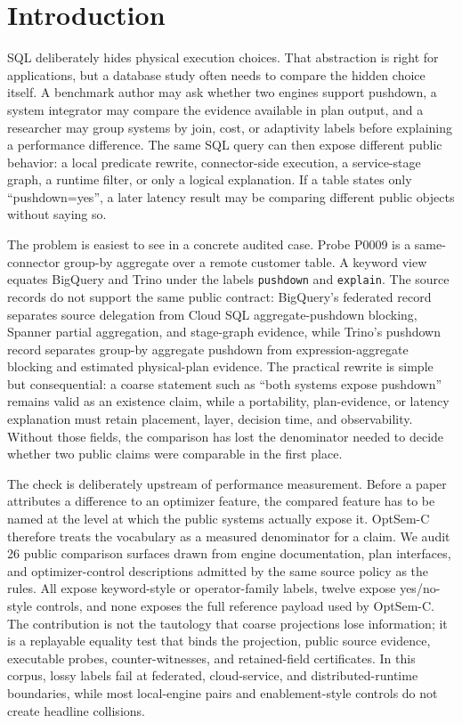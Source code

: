 \section{Introduction}
SQL deliberately hides physical execution choices.  That abstraction is right for applications, but a database study often needs to compare the hidden choice itself.  A benchmark author may ask whether two engines support pushdown, a system integrator may compare the evidence available in plan output, and a researcher may group systems by join, cost, or adaptivity labels before explaining a performance difference.  The same SQL query can then expose different public behavior: a local predicate rewrite, connector-side execution, a service-stage graph, a runtime filter, or only a logical explanation.  If a table states only ``pushdown=yes'', a later latency result may be comparing different public objects without saying so.

The problem is easiest to see in a concrete audited case.  Probe P0009 is a same-connector group-by aggregate over a remote customer table.  A keyword view equates BigQuery and Trino under the labels \texttt{pushdown} and \texttt{explain}.  The source records do not support the same public contract: BigQuery's federated record separates source delegation from Cloud SQL aggregate-pushdown blocking, Spanner partial aggregation, and stage-graph evidence, while Trino's pushdown record separates group-by aggregate pushdown from expression-aggregate blocking and estimated physical-plan evidence.  The practical rewrite is simple but consequential: a coarse statement such as ``both systems expose pushdown'' remains valid as an existence claim, while a portability, plan-evidence, or latency explanation must retain placement, layer, decision time, and observability.  Without those fields, the comparison has lost the denominator needed to decide whether two public claims were comparable in the first place.

The check is deliberately upstream of performance measurement.  Before a paper attributes a difference to an optimizer feature, the compared feature has to be named at the level at which the public systems actually expose it.  OptSem-C therefore treats the vocabulary as a measured denominator for a claim.  We audit 26 public comparison surfaces drawn from engine documentation, plan interfaces, and optimizer-control descriptions admitted by the same source policy as the rules.  All expose keyword-style or operator-family labels, twelve expose yes/no-style controls, and none exposes the full reference payload used by OptSem-C.  The contribution is not the tautology that coarse projections lose information; it is a replayable equality test that binds the projection, public source evidence, executable probes, counter-witnesses, and retained-field certificates.  In this corpus, lossy labels fail at federated, cloud-service, and distributed-runtime boundaries, while most local-engine pairs and enablement-style controls do not create headline collisions.

